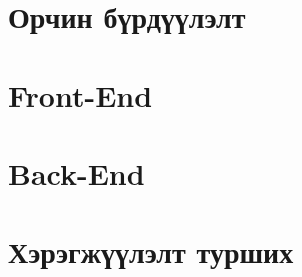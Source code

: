\section{Орчин бүрдүүлэлт}


\section{Front-End}


\section{Back-End}


\section{Хэрэгжүүлэлт турших}

